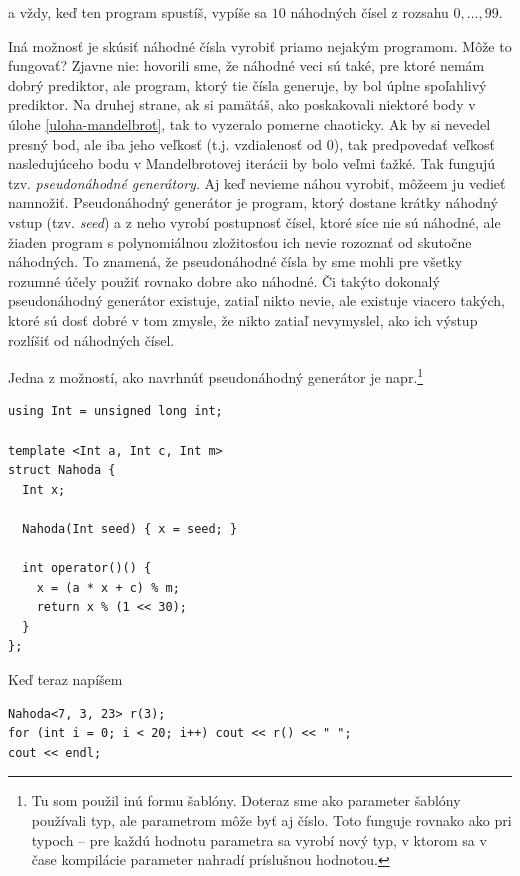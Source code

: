 \documentclass[10pt]{article}
\def\ods{\vspace*{10pt}}
\begin{document}
{a vždy, keď ten program spustíš, vypíše sa $10$ náhodných čísel z rozsahu 
$0,\ldots,99$.

\ods
Iná možnosť je skúsiť náhodné čísla vyrobiť priamo nejakým programom. Môže to 
fungovať? Zjavne nie: hovorili sme, že náhodné veci sú také, pre ktoré nemám
dobrý prediktor, ale program, ktorý tie čísla generuje, by bol úplne spoľahlivý
prediktor. Na druhej strane, ak si pamätáš, ako poskakovali niektoré body v
úlohe \ref{uloha-mandelbrot}, tak to vyzeralo pomerne chaoticky. Ak by si
nevedel presný bod, ale iba jeho veľkosť (t.j. vzdialenosť od 0), tak predpovedať
veľkosť nasledujúceho bodu v Mandelbrotovej iterácii by bolo veľmi ťažké. 
Tak fungujú tzv. {\em pseudonáhodné generátory}.
Aj keď nevieme
náhou vyrobiť, môžeem ju vedieť namnožiť. 
Pseudonáhodný generátor je program, ktorý dostane krátky náhodný vstup (tzv. 
{\em seed}) a z neho vyrobí postupnosť čísel, ktoré síce nie sú náhodné, ale žiaden
program s polynomiálnou zložitosťou ich nevie rozoznať od skutočne náhodných. To 
znamená, že pseudonáhodné čísla by sme mohli pre všetky rozumné účely použiť rovnako
dobre ako náhodné. Či takýto dokonalý pseudonáhodný generátor existuje, zatiaľ nikto
nevie, ale existuje viacero takých, 
ktoré sú dosť dobré v tom zmysle, že nikto zatiaľ nevymyslel,
ako ich výstup rozlíšiť od náhodných čísel.

\ods 
Jedna z možností, ako navrhnúť pseudonáhodný generátor je napr.\footnote{%
  Tu som použil inú formu šablóny. Doteraz sme ako parameter šablóny 
  používali typ, ale parametrom môže byť aj číslo. Toto funguje rovnako 
  ako pri typoch -- pre každú hodnotu parametra sa vyrobí nový typ, v ktorom 
  sa v čase kompilácie parameter nahradí príslušnou hodnotou.
}

\begin{lstlisting}
using Int = unsigned long int;

template <Int a, Int c, Int m>
struct Nahoda {
  Int x; 

  Nahoda(Int seed) { x = seed; }
  
  int operator()() {
    x = (a * x + c) % m;
    return x % (1 << 30);
  }
};
\end{lstlisting}

\ods
Keď teraz napíšem

\begin{lstlisting}
Nahoda<7, 3, 23> r(3);
for (int i = 0; i < 20; i++) cout << r() << " ";
cout << endl;
\end{lstlisting}

}
\end{document}
